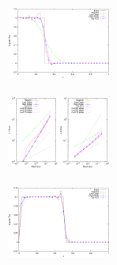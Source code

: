 \begin{tikzfigure}
  \includegraphics[width=0.20\textwidth]{figures/solutions_3_SSPRK33.pdf}
\end{tikzfigure}

\begin{tikzfigure}
  \includegraphics[width=0.20\textwidth]{figures/convergence_3_SSPRK33.pdf}
\end{tikzfigure}

\begin{tikzfigure}
  \includegraphics[width=0.20\textwidth]{figures/solutions_8_SSPRK33.pdf}
\end{tikzfigure}

